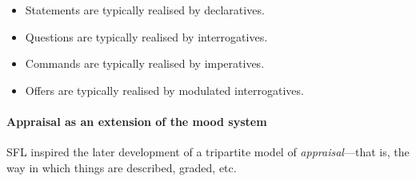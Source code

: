 			\begin{itemize}
			\item Statements are typically realised by declaratives.
			\item Questions are typically realised by interrogatives.
			\item Commands are typically realised by imperatives.
			\item Offers are typically realised by modulated interrogatives.
			\end{itemize}
			
		 \paragraph{Appraisal as an extension of the mood system}

			SFL inspired the later development of a tripartite model of \emph{appraisal}---that is, the way in which things are described, graded, etc.



